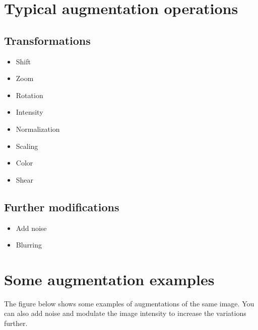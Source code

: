 \documentclass[letterpaper,10pt,english]{sphinxmanual}
\begin{document}
\section{Typical augmentation operations}
\label{\detokenize{03-Datasets:typical-augmentation-operations}}

\subsection{Transformations}
\label{\detokenize{03-Datasets:transformations}}\begin{itemize}
\item {} 
\sphinxAtStartPar
Shift

\item {} 
\sphinxAtStartPar
Zoom

\item {} 
\sphinxAtStartPar
Rotation

\item {} 
\sphinxAtStartPar
Intensity

\item {} 
\sphinxAtStartPar
Normalization

\item {} 
\sphinxAtStartPar
Scaling

\item {} 
\sphinxAtStartPar
Color

\item {} 
\sphinxAtStartPar
Shear

\end{itemize}


\subsection{Further modifications}
\label{\detokenize{03-Datasets:further-modifications}}\begin{itemize}
\item {} 
\sphinxAtStartPar
Add noise

\item {} 
\sphinxAtStartPar
Blurring

\end{itemize}


\section{Some augmentation examples}
\label{\detokenize{03-Datasets:some-augmentation-examples}}
\sphinxAtStartPar
The figure below shows some examples of augmentations of the same image. You can also add noise and modulate the image intensity to increase the variations further.
\end{document}
